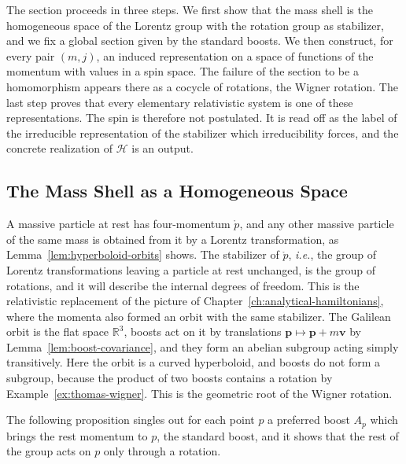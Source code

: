 	The section proceeds in three steps. We first show that the mass shell is the homogeneous space of the Lorentz group with the rotation group as stabilizer, and we fix a global section given by the standard boosts. We then construct, for every pair $(m,j)$, an induced representation on a space of functions of the momentum with values in a spin space. The failure of the section to be a homomorphism appears there as a cocycle of rotations, the Wigner rotation. The last step proves that every elementary relativistic system is one of these representations. The spin is therefore not postulated. It is read off as the label of the irreducible representation of the stabilizer which irreducibility forces, and the concrete realization of $\mathcal{H}$ is an output.
	
	\subsection{The Mass Shell as a Homogeneous Space}\label{sec:mass-shell}
	
	A massive particle at rest has four-momentum $\mathring{p}$, and any other massive particle of the same mass is obtained from it by a Lorentz transformation, as Lemma~\ref{lem:hyperboloid-orbits} shows. The stabilizer of $\mathring{p}$, \textit{i.e.}, the group of Lorentz transformations leaving a particle at rest unchanged, is the group of rotations, and it will describe the internal degrees of freedom. This is the relativistic replacement of the picture of Chapter~\ref{ch:analytical-hamiltonians}, where the momenta also formed an orbit with the same stabilizer. The Galilean orbit is the flat space $\mathbb{R}^3$, boosts act on it by translations $\mathbf{p}\mapsto\mathbf{p}+m\mathbf{v}$ by Lemma~\ref{lem:boost-covariance}, and they form an abelian subgroup acting simply transitively. Here the orbit is a curved hyperboloid, and boosts do not form a subgroup, because the product of two boosts contains a rotation by Example~\ref{ex:thomas-wigner}. This is the geometric root of the Wigner rotation.
	
	The following proposition singles out for each point $p$ a preferred boost $A_p$ which brings the rest momentum to $p$, the standard boost, and it shows that the rest of the group acts on $p$ only through a rotation.
	
